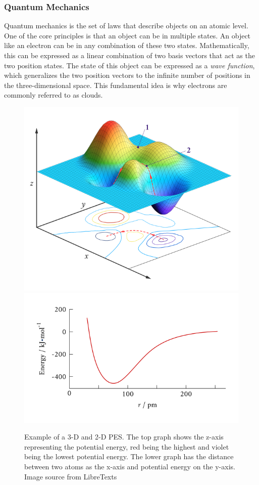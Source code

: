 \documentclass[12pt, abstract = true]{scrartcl}
\begin{document}
\subsubsection{Quantum Mechanics}
Quantum mechanics is the set of laws that describe objects on an atomic level. One of the core
principles is that an object can be in multiple states. An object like an electron can be in any 
combination of these two states. Mathematically, this can be expressed as a linear combination of 
two basis vectors that act as the two position states. The state of this object can be expressed 
as a \emph{wave function}, which generalizes the two position vectors to the infinite number of 
positions in the three-dimensional space. This fundamental idea is why electrons are commonly 
referred to as clouds.

\begin{figure}
  \centering
  \includegraphics[scale=.4]{pes.png}
  \includegraphics[scale=.4]{pes2.png}
  
  \caption{Example of a 3-D and 2-D PES. The top graph shows the z-axis representing the potential energy, red being the highest and violet being the lowest potential energy. The lower graph has the distance between two atoms as the x-axis and potential energy on the y-axis. Image source from LibreTexts\cite{pesimage}}\label{fig:pes}
\end{figure}
\end{document}
